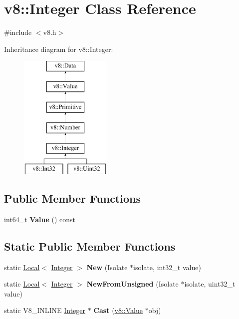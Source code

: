 \hypertarget{classv8_1_1Integer}{}\section{v8\+:\+:Integer Class Reference}
\label{classv8_1_1Integer}


{\ttfamily \#include $<$v8.\+h$>$}

Inheritance diagram for v8\+:\+:Integer\+:\begin{figure}[H]
\begin{center}
\leavevmode
\includegraphics[height=6.000000cm]{classv8_1_1Integer}
\end{center}
\end{figure}
\subsection*{Public Member Functions}
\begin{DoxyCompactItemize}
\item 
\mbox{\label{classv8_1_1Integer_aefa7d26a62f0a59f18b229bf3347fa47}} 
int64\+\_\+t {\bfseries Value} () const
\end{DoxyCompactItemize}
\subsection*{Static Public Member Functions}
\begin{DoxyCompactItemize}
\item 
\mbox{\label{classv8_1_1Integer_a730d6e093c16d95edb5b92a4d05773d0}} 
static \mbox{\hyperlink{classv8_1_1Local}{Local}}$<$ \mbox{\hyperlink{classv8_1_1Integer}{Integer}} $>$ {\bfseries New} (Isolate $\ast$isolate, int32\+\_\+t value)
\item 
\mbox{\label{classv8_1_1Integer_a6fbd6e79db802c737cb0bd5a259f134b}} 
static \mbox{\hyperlink{classv8_1_1Local}{Local}}$<$ \mbox{\hyperlink{classv8_1_1Integer}{Integer}} $>$ {\bfseries New\+From\+Unsigned} (Isolate $\ast$isolate, uint32\+\_\+t value)
\item 
\mbox{\label{classv8_1_1Integer_a886f73d3d8bb91f8235f66d8dccec12a}} 
static V8\+\_\+\+I\+N\+L\+I\+NE \mbox{\hyperlink{classv8_1_1Integer}{Integer}} $\ast$ {\bfseries Cast} (\mbox{\hyperlink{classv8_1_1Value}{v8\+::\+Value}} $\ast$obj)
\end{DoxyCompactItemize}


